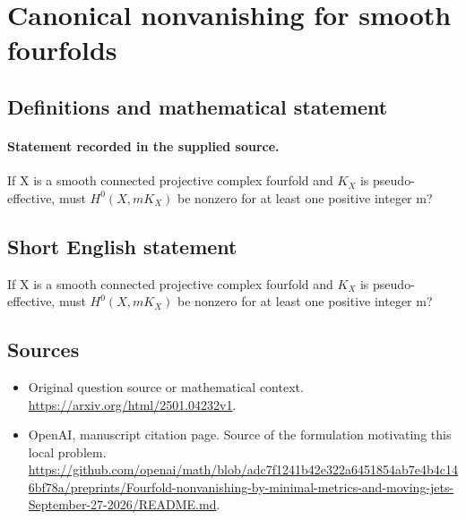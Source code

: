 \documentclass[11pt]{article}
\begin{document}
\section*{Canonical nonvanishing for smooth fourfolds}\label{statement}
\subsection{Definitions and mathematical statement}
\paragraph{Statement recorded in the supplied source.}
If X is a smooth connected projective complex fourfold and $K_X$ is pseudo-effective, must $H^{0}(X,mK_X)$ be nonzero for at least one positive integer m?
\subsection{Short English statement}
If X is a smooth connected projective complex fourfold and $K_X$ is pseudo-effective, must $H^{0}(X,mK_X)$ be nonzero for at least one positive integer m?
\subsection{Sources}
\begin{itemize}
\item[S1] Original question source or mathematical context.
\url{https://arxiv.org/html/2501.04232v1}.
\item[S2] OpenAI, manuscript citation page. Source of the formulation motivating this local problem.
\url{https://github.com/openai/math/blob/adc7f1241b42e322a6451854ab7e4b4c146bf78a/preprints/Fourfold-nonvanishing-by-minimal-metrics-and-moving-jets-September-27-2026/README.md}.
\end{itemize}
\end{document}
